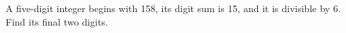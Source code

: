 A five-digit integer begins with 158, its digit sum is 15, and it is divisible by 6. Find its final two digits.
